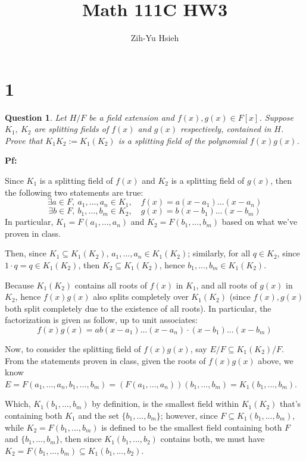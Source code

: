 \documentclass{article}
\title{Math 111C HW3}
\author{Zih-Yu Hsieh}
\newtheorem{question}{Question}
\begin{document}
\maketitle

\section*{1}
\begin{myBox}[]{}
    \begin{question}
        Let $H/F$ be a field extension and $f(x), g(x) \in F[x]$. Suppose $K_1,\ K_2$ are splitting
        fields of $f(x)$ and $g(x)$ respectively, contained in $H$. Prove that $K_1K_2:=K_1(K_2)$ is a
        splitting field of the polynomial $f(x)g(x)$.
    \end{question}
\end{myBox}

\textbf{Pf:}

Since $K_1$ is a splitting field of $f(x)$ and $K_2$ is a splitting field of $g(x)$, then the following two statements are true:
$$\exists a\in F,\ a_1,...,a_n\in K_1,\quad f(x)=a(x-a_1)...(x-a_n)$$
$$\exists b\in F,\ b_1,...,b_m\in K_2,\quad g(x)=b(x-b_1)...(x-b_m)$$
In particular, $K_1=F(a_1,...,a_n)$ and $K_2=F(b_1,...,b_m)$ based on what we've proven in class.

Then, since $K_1\subseteq K_1(K_2)$, $a_1,...,a_n\in K_1(K_2)$; similarly, for all $q\in K_2$, since $1\cdot q=q\in K_1(K_2)$, then $K_2\subseteq K_1(K_2)$, hence $b_1,...,b_m\in K_1(K_2)$.

Because $K_1(K_2)$ contains all roots of $f(x)$ in $K_1$, and all roots of $g(x)$ in $K_2$, hence $f(x)g(x)$ also splits completely over $K_1(K_2)$ (since $f(x),g(x)$ both split completely due to the existence of all roots).
In particular, the factorization is given as follow, up to unit associates:
$$f(x)g(x)=ab(x-a_1)...(x-a_n)\cdot (x-b_1)...(x-b_m)$$

\hfil

Now, to consider the splitting field of $f(x)g(x)$, say $E/F\subseteq K_1(K_2)/F$. From the statements proven in class, given the roots of $f(x)g(x)$ above, we know $E=F(a_1,...,a_n,b_1,...,b_m) = \left(F(a_1,...,a_n)\right)(b_1,...,b_m)=K_1(b_1,...,b_m)$.

Which, $K_1(b_1,...,b_m)$ by definition, is the smallest field within $K_1(K_2)$ that's containing both $K_1$ and the set $\{b_1,...,b_m\}$; however, since $F\subseteq K_1(b_1,...,b_m)$, while $K_2=F(b_1,...,b_m)$ is defined to be the smallest field containing both $F$ and $\{b_1,...,b_m\}$,
then since $K_1(b_1,...,b_2)$ contains both, we must have $K_2=F(b_1,...,b_m)\subseteq K_1(b_1,...,b_2)$.
\end{document}
